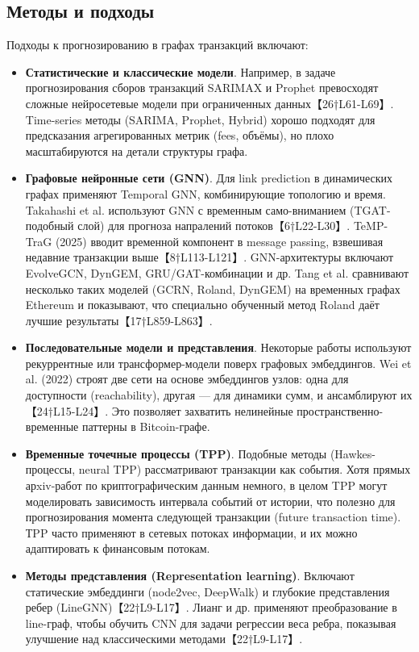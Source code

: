 \subsection{Методы и подходы}
Подходы к прогнозированию в графах транзакций включают:
\begin{itemize}
\item \textbf{Статистические и классические модели}. Например, в задаче прогнозирования сборов транзакций SARIMAX и Prophet превосходят сложные нейросетевые модели при ограниченных данных【26†L61-L69】. Time-series методы (SARIMA, Prophet, Hybrid) хорошо подходят для предсказания агрегированных метрик (fees, объёмы), но плохо масштабируются на детали структуры графа.
\item \textbf{Графовые нейронные сети (GNN)}. Для link prediction в динамических графах применяют Temporal GNN, комбинирующие топологию и время. Takahashi et al. используют GNN с временным само-вниманием (TGAT-подобный слой) для прогноза напралений потоков【6†L22-L30】. TeMP-TraG (2025) вводит временной компонент в message passing, взвешивая недавние транзакции выше【8†L113-L121】. GNN-архитектуры включают EvolveGCN, DynGEM, GRU/GAT-комбинации и др. Tang et al. сравнивают несколько таких моделей (GCRN, Roland, DynGEM) на временных графах Ethereum и показывают, что специально обученный метод Roland даёт лучшие результаты【17†L859-L863】. 
\item \textbf{Последовательные модели и представления}. Некоторые работы используют рекуррентные или трансформер-модели поверх графовых эмбеддингов. Wei et al. (2022) строят две сети на основе эмбеддингов узлов: одна для доступности (reachability), другая — для динамики сумм, и ансамблируют их【24†L15-L24】. Это позволяет захватить нелинейные пространственно-временные паттерны в Bitcoin-графе.
\item \textbf{Временные точечные процессы (TPP)}. Подобные методы (Hawkes-процессы, neural TPP) рассматривают транзакции как события. Хотя прямых арxiv-работ по криптографическим данным немного, в целом TPP могут моделировать зависимость интервала событий от истории, что полезно для прогнозирования момента следующей транзакции (future transaction time). ТPP часто применяют в сетевых потоках информации, и их можно адаптировать к финансовым потокам.
\item \textbf{Методы представления (Representation learning)}. Включают статические эмбеддинги (node2vec, DeepWalk) и глубокие представления ребер (LineGNN)【22†L9-L17】. Лианг и др. применяют преобразование в line-граф, чтобы обучить CNN для задачи регрессии веса ребра, показывая улучшение над классическими методами【22†L9-L17】. 
\end{itemize}

